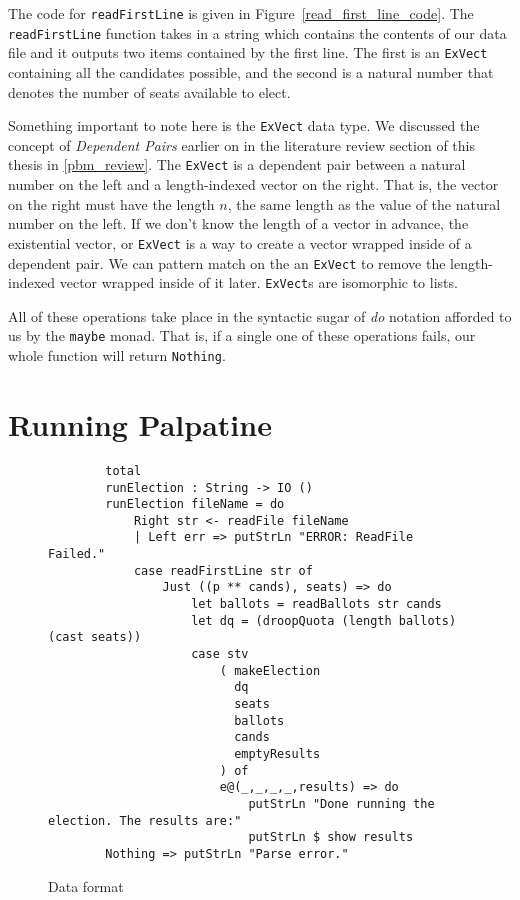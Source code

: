 The code for \texttt{readFirstLine} is given in
Figure~\ref{read_first_line_code}. The \texttt{readFirstLine} function takes in
a string which contains the contents of our data file and it outputs two items
contained by the first line. The first is an \texttt{ExVect} containing all the
candidates possible, and the second is a natural number that denotes the number
of seats available to elect. 

Something important to note here is the \texttt{ExVect} data type. We discussed
the concept of \textit{Dependent Pairs} earlier on in the literature review
section of this thesis in \autoref{pbm_review}. The \texttt{ExVect} is a
dependent pair between a natural number on the left and a length-indexed vector
on the right. That is, the vector on the right must have the length $n$, the
same length as the value of the natural number on the left. If we don't know the
length of a vector in advance, the existential vector, or \texttt{ExVect} is a
way to create a vector wrapped inside of a dependent pair. We can pattern match
on the an \texttt{ExVect} to remove the length-indexed vector wrapped inside of
it later. \texttt{ExVect}s are isomorphic to lists. 

All of these operations take place in the syntactic sugar of \textit{do}
notation afforded to us by the \texttt{maybe} monad. That is, if a single one of
these operations fails, our whole function will return \texttt{Nothing}. 

\section{Running Palpatine}

\begin{figure}[ht!!!!!!!]
    \caption{Data format}
    \label{main_code}
    \begin{lstlisting}
        total
        runElection : String -> IO ()
        runElection fileName = do
            Right str <- readFile fileName
            | Left err => putStrLn "ERROR: ReadFile Failed."
            case readFirstLine str of
                Just ((p ** cands), seats) => do 
                    let ballots = readBallots str cands
                    let dq = (droopQuota (length ballots) (cast seats))
                    case stv
                        ( makeElection 
                          dq
                          seats
                          ballots
                          cands
                          emptyResults
                        ) of
                        e@(_,_,_,_,results) => do
                            putStrLn "Done running the election. The results are:"
                            putStrLn $ show results
        Nothing => putStrLn "Parse error."
    \end{lstlisting}
\end{figure}

